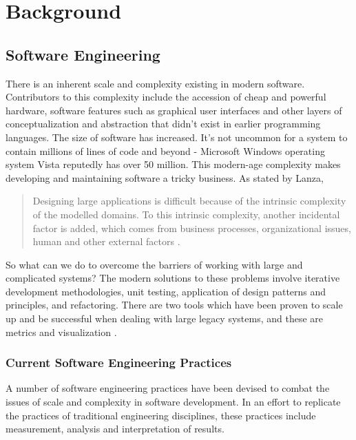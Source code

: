 
\chapter{Background}
\ifpdf
    \graphicspath{{Chapter1/Chapter1Figs/PNG/}{Chapter1/Chapter1Figs/PDF/}{Chapter1/Chapter1Figs/}}
\else
    \graphicspath{{Chapter1/Chapter1Figs/EPS/}{Chapter1/Chapter1Figs/}}
\fi

\section{Software Engineering}
There is an inherent scale and complexity existing in modern software. Contributors to this complexity include the accession of cheap and powerful hardware, software features such as graphical user interfaces and other layers of conceptualization and abstraction that didn't exist in earlier programming languages. The size of software has increased. It's not uncommon for a system to contain millions of lines of code and beyond - Microsoft Windows operating system Vista reputedly has over 50 million. This modern-age complexity makes developing and maintaining software a tricky business. As stated by Lanza,

\begin{quote}
Designing large applications is difficult because of the intrinsic complexity of the modelled domains. To this intrinsic complexity, another incidental factor is added, which comes from business processes, organizational issues, human and other external factors \citep[pg.~1]{lanza06}.
\end{quote} 

So what can we do to overcome the barriers of working with large and complicated systems? The modern solutions to these problems involve iterative development methodologies, unit testing, application of design patterns and principles, and refactoring. There are two tools which have been proven to scale up and be successful when dealing with large legacy systems, and these are metrics and visualization \citep{lanza06}. 

\subsection{Current Software Engineering Practices}
A number of software engineering practices have been devised to combat the issues of scale and complexity in software development. In an effort to replicate the practices of traditional engineering disciplines, these practices include measurement, analysis and interpretation of results.

